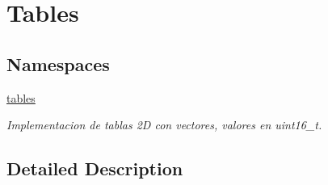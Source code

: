 \hypertarget{group__Tables}{}\section{Tables}
\label{group__Tables}
\subsection*{Namespaces}
\begin{DoxyCompactItemize}
\item 
 \hyperlink{namespacetables}{tables}
\begin{DoxyCompactList}\small\item\em Implementacion de tablas 2D con vectores, valores en uint16\+\_\+t. \end{DoxyCompactList}\end{DoxyCompactItemize}


\subsection{Detailed Description}
